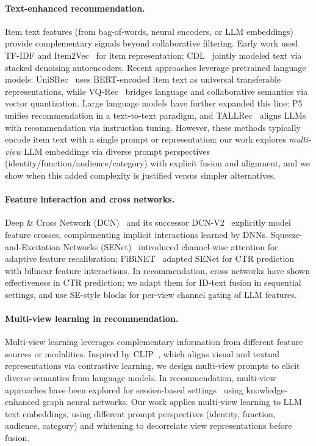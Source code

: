 \documentclass[sigconf,natbib=true]{acmart}
\newcommand{\llm}{\textsc{LLM}\xspace}
\begin{document}
\paragraph{Text-enhanced recommendation.}
Item text features (from bag-of-words, neural encoders, or
\llm embeddings) provide complementary signals beyond
collaborative filtering. Early work used TF-IDF and
Item2Vec~\cite{barkan2016item2vec} for item representation;
CDL~\cite{wang2015cdl} jointly modeled text via stacked
denoising autoencoders. Recent approaches leverage pretrained
language models: UniSRec~\cite{hou2022unisrec} uses
BERT-encoded item text as universal transferable
representations, while VQ-Rec~\cite{hou2023vqrec} bridges
language and collaborative semantics via vector quantization.
Large language models have further expanded this line:
P5~\cite{geng2022p5} unifies recommendation in a text-to-text
paradigm, and TALLRec~\cite{bao2023tallrec} aligns LLMs with
recommendation via instruction tuning. However, these methods
typically encode item text with a single prompt or
representation; our work explores \emph{multi-view} \llm
embeddings via diverse prompt perspectives
(identity/function/audience/category) with explicit fusion and
alignment, and we show when this added complexity is justified
versus simpler alternatives.

\paragraph{Feature interaction and cross networks.}
Deep \& Cross Network (DCN)~\cite{wang2017dcn} and its
successor DCN-V2~\cite{wang2021dcnv2} explicitly model feature
crosses, complementing implicit interactions learned by DNNs.
Squeeze-and-Excitation Networks (SENet)~\cite{hu2018senet}
introduced channel-wise attention for adaptive feature
recalibration; FiBiNET~\cite{huang2019fibinet} adapted SENet
for CTR prediction with bilinear feature interactions. In
recommendation, cross networks have shown effectiveness in CTR
prediction; we adapt them for ID-text fusion in sequential
settings, and use SE-style blocks for per-view channel gating of \llm
features.

\paragraph{Multi-view learning in recommendation.}
Multi-view learning leverages complementary information from
different feature sources or modalities. Inspired by
CLIP~\cite{radford2021clip}, which aligns visual and textual
representations via contrastive learning, we design multi-view
prompts to elicit diverse semantics from language models. In
recommendation, multi-view approaches have been explored for
session-based settings~\cite{wang2023kgmvgnn} using
knowledge-enhanced graph neural networks. Our work applies
multi-view learning to \llm text embeddings, using different
prompt perspectives (identity, function, audience, category)
and whitening to decorrelate view representations before
fusion.
\end{document}
